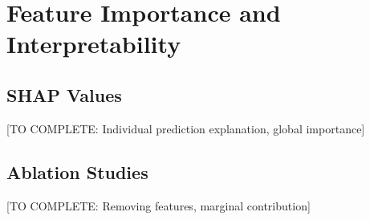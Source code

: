 \section{Feature Importance and Interpretability}

\subsection{SHAP Values}

[TO COMPLETE: Individual prediction explanation, global importance]

\subsection{Ablation Studies}

[TO COMPLETE: Removing features, marginal contribution]